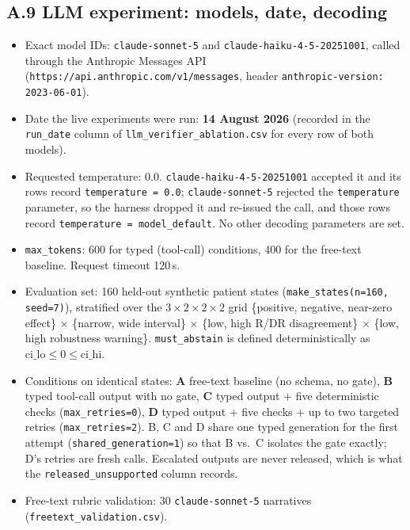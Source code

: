 \subsection*{A.9 LLM experiment: models, date, decoding}

\begin{itemize}\tightlist
\item Exact model IDs: \texttt{claude-sonnet-5} and
\texttt{claude-haiku-4-5-20251001}, called through the Anthropic Messages API
(\texttt{https://api.anthropic.com/v1/messages}, header
\texttt{anthropic-version: 2023-06-01}).
\item Date the live experiments were run: \textbf{14 August 2026} (recorded in
the \texttt{run\_date} column of \texttt{llm\_verifier\_ablation.csv} for every
row of both models).
\item Requested temperature: $0.0$. \texttt{claude-haiku-4-5-20251001} accepted
it and its rows record \texttt{temperature = 0.0};
\texttt{claude-sonnet-5} rejected the \texttt{temperature} parameter, so the
harness dropped it and re-issued the call, and those rows record
\texttt{temperature = model\_default}. No other decoding parameters are set.
\item \texttt{max\_tokens}: 600 for typed (tool-call) conditions, 400 for the
free-text baseline. Request timeout 120\,s.
\item Evaluation set: 160 held-out synthetic patient states
(\texttt{make\_states(n=160, seed=7)}), stratified over the $3\times2\times2\times2$
grid \{positive, negative, near-zero effect\} $\times$ \{narrow, wide interval\}
$\times$ \{low, high R/DR disagreement\} $\times$ \{low, high robustness
warning\}. \texttt{must\_abstain} is defined deterministically as
$\mathrm{ci\_lo} \le 0 \le \mathrm{ci\_hi}$.
\item Conditions on identical states: \textbf{A} free-text baseline (no schema,
no gate), \textbf{B} typed tool-call output with no gate, \textbf{C} typed
output $+$ five deterministic checks (\texttt{max\_retries=0}), \textbf{D} typed
output $+$ five checks $+$ up to two targeted retries
(\texttt{max\_retries=2}). B, C and D share one typed generation for the first
attempt (\texttt{shared\_generation=1}) so that B vs.\ C isolates the gate
exactly; D's retries are fresh calls. Escalated outputs are never released, which
is what the \texttt{released\_unsupported} column records.
\item Free-text rubric validation: 30 \texttt{claude-sonnet-5} narratives
(\texttt{freetext\_validation.csv}).
\end{itemize}

